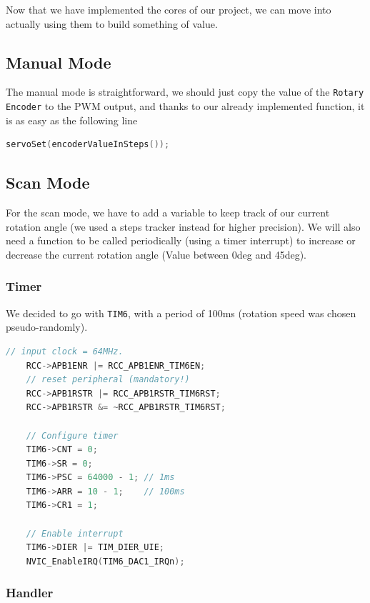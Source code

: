 \documentclass{article}
\begin{document}
Now that we have implemented the cores of our project, we can move into actually using them to build something of value.

\subsection{Manual Mode}

The manual mode is straightforward, we should just copy the value of the \verb|Rotary Encoder| to the PWM output, and thanks to our already implemented function, it is as easy as the following line

\begin{lstlisting}[language=C++, caption={Manual Mode one-liner}]
    	servoSet(encoderValueInSteps());
\end{lstlisting}

\subsection{Scan Mode}

For the scan mode, we have to add a variable to keep track of our current rotation angle (we used a steps tracker instead for higher precision).
We will also need a function to be called periodically (using a timer interrupt) to increase or decrease the current rotation angle (Value between 0deg and 45deg).

\subsubsection{Timer}
We decided to go with \verb|TIM6|, with a period of 100ms (rotation speed was chosen pseudo-randomly).

\begin{lstlisting}[language=C++, caption={TIM6 Config}]
    // input clock = 64MHz.
    RCC->APB1ENR |= RCC_APB1ENR_TIM6EN;
    // reset peripheral (mandatory!)
    RCC->APB1RSTR |= RCC_APB1RSTR_TIM6RST;
    RCC->APB1RSTR &= ~RCC_APB1RSTR_TIM6RST;

    // Configure timer
    TIM6->CNT = 0;
    TIM6->SR = 0;
    TIM6->PSC = 64000 - 1; // 1ms
    TIM6->ARR = 10 - 1;    // 100ms
    TIM6->CR1 = 1;

    // Enable interrupt
    TIM6->DIER |= TIM_DIER_UIE;
    NVIC_EnableIRQ(TIM6_DAC1_IRQn);
\end{lstlisting}

\subsubsection{Handler}
\end{document}
